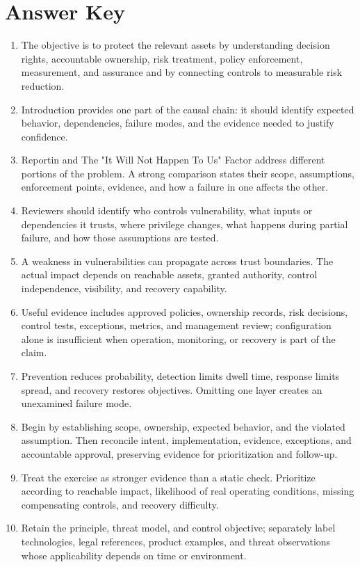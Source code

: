 \documentclass[11pt,letterpaper]{article}
\begin{document}
\section*{Answer Key}
\begin{enumerate}
\item The objective is to protect the relevant assets by understanding decision rights, accountable ownership, risk treatment, policy enforcement, measurement, and assurance and by connecting controls to measurable risk reduction.
\item Introduction provides one part of the causal chain: it should identify expected behavior, dependencies, failure modes, and the evidence needed to justify confidence.
\item Reportin and The "It Will Not Happen To Us" Factor address different portions of the problem. A strong comparison states their scope, assumptions, enforcement points, evidence, and how a failure in one affects the other.
\item Reviewers should identify who controls vulnerability, what inputs or dependencies it trusts, where privilege changes, what happens during partial failure, and how those assumptions are tested.
\item A weakness in vulnerabilities can propagate across trust boundaries. The actual impact depends on reachable assets, granted authority, control independence, visibility, and recovery capability.
\item Useful evidence includes approved policies, ownership records, risk decisions, control tests, exceptions, metrics, and management review; configuration alone is insufficient when operation, monitoring, or recovery is part of the claim.
\item Prevention reduces probability, detection limits dwell time, response limits spread, and recovery restores objectives. Omitting one layer creates an unexamined failure mode.
\item Begin by establishing scope, ownership, expected behavior, and the violated assumption. Then reconcile intent, implementation, evidence, exceptions, and accountable approval, preserving evidence for prioritization and follow-up.
\item Treat the exercise as stronger evidence than a static check. Prioritize according to reachable impact, likelihood of real operating conditions, missing compensating controls, and recovery difficulty.
\item Retain the principle, threat model, and control objective; separately label technologies, legal references, product examples, and threat observations whose applicability depends on time or environment.
\end{enumerate}
\end{document}
